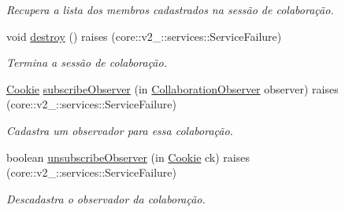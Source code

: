 \begin{DoxyCompactItemize}
\begin{DoxyCompactList}\small\item\em \-Recupera a lista dos membros cadastrados na sessão de colaboração. \end{DoxyCompactList}\item 
\hypertarget{interfacetecgraf_1_1openbus_1_1services_1_1collaboration_1_1v1__0_1_1CollaborationSession_a80c18276bb6290ff01af836f963c784f}{void \hyperlink{interfacetecgraf_1_1openbus_1_1services_1_1collaboration_1_1v1__0_1_1CollaborationSession_a80c18276bb6290ff01af836f963c784f}{destroy} ()  raises (core\-::v2\-\_\-::services\-::\-Service\-Failure)}\label{interfacetecgraf_1_1openbus_1_1services_1_1collaboration_1_1v1__0_1_1CollaborationSession_a80c18276bb6290ff01af836f963c784f}

\begin{DoxyCompactList}\small\item\em \-Termina a sessão de colaboração. \end{DoxyCompactList}\item 
\hyperlink{namespacetecgraf_1_1openbus_1_1services_1_1collaboration_1_1v1__0_a0ae94dd917c8ec58f4a7fcc2087064be}{\-Cookie} \hyperlink{interfacetecgraf_1_1openbus_1_1services_1_1collaboration_1_1v1__0_1_1CollaborationSession_a969815aed1da7833950d0901ed19f428}{subscribe\-Observer} (in \hyperlink{interfacetecgraf_1_1openbus_1_1services_1_1collaboration_1_1v1__0_1_1CollaborationObserver}{\-Collaboration\-Observer} observer)  raises (core\-::v2\-\_\-::services\-::\-Service\-Failure)
\begin{DoxyCompactList}\small\item\em \-Cadastra um observador para essa colaboração. \end{DoxyCompactList}\item 
boolean \hyperlink{interfacetecgraf_1_1openbus_1_1services_1_1collaboration_1_1v1__0_1_1CollaborationSession_a8920cae7696fa3f54e9c127e34a76fec}{unsubscribe\-Observer} (in \hyperlink{namespacetecgraf_1_1openbus_1_1services_1_1collaboration_1_1v1__0_a0ae94dd917c8ec58f4a7fcc2087064be}{\-Cookie} ck)  raises (core\-::v2\-\_\-::services\-::\-Service\-Failure)
\begin{DoxyCompactList}\small\item\em \-Descadastra o observador da colaboração. \end{DoxyCompactList}\end{DoxyCompactItemize}
